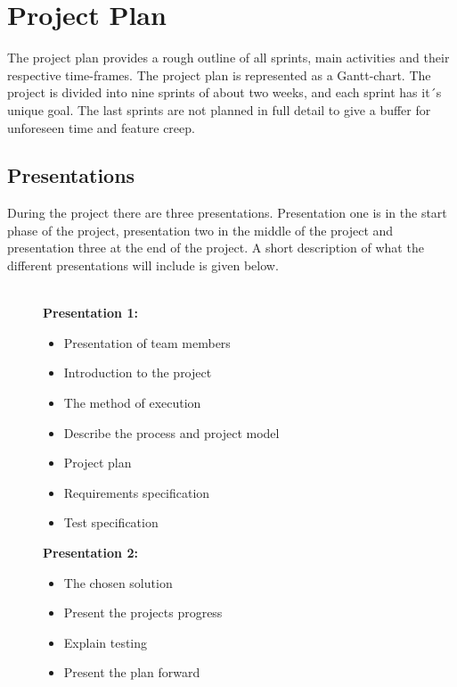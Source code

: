\section{Project Plan}

The project plan provides a rough outline of all sprints, main activities and their respective time-frames. The project plan is represented as a Gantt-chart. The project is divided into nine sprints of about two weeks, and each sprint has it´s unique goal. The last sprints are not planned in full detail to give a buffer for unforeseen time and feature creep.

\subsection{Presentations}
During the project there are three presentations. Presentation one is in the start phase of the project, presentation two in the middle of the project and presentation three at the end of the project. A short description of what the different presentations will include is given below. \\\\
\begin{figure}[h]
\begin{minipage}[t]{0.5\textwidth}
\textbf{Presentation 1:}
\begin{itemize}
  \item Presentation of team members
  \item Introduction to the project
  \item The method of execution
  \item Describe the process and project model 
  \item Project plan
  \item Requirements specification
  \item Test specification 
\end{itemize}
\end{minipage}
\hfill
\begin{minipage}[t]{0.5\textwidth}
\textbf{Presentation 2:}
\begin{itemize}
  \item The chosen solution
  \item Present the projects progress
  \item Explain testing
  \item Present the plan forward
\end{itemize}
\end{minipage}
\hfill
\end{figure}\\
